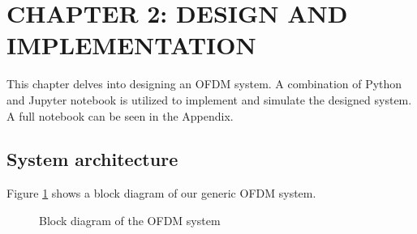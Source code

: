 \section*{CHAPTER 2: DESIGN AND IMPLEMENTATION}
\setcounter{section}{2}
\setcounter{subsection}{0}
\setcounter{figure}{0}
\setcounter{table}{0}

This chapter delves into designing an OFDM system. A combination of Python and Jupyter notebook is utilized to implement and simulate the designed system. A full notebook can be seen in the Appendix. 

\subsection{System architecture}
Figure \ref{diagram} shows a block diagram of our generic OFDM system.

\begin{figure}[htbp]
    \centering
    
    \caption{Block diagram of the OFDM system}
    \label{diagram}
\end{figure}

